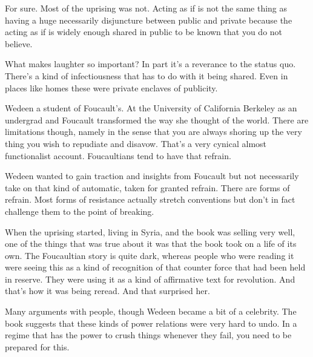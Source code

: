 \documentclass{article}
\begin{document}
\vspace{5mm}

For sure.  Most of the uprising was not.  Acting as if is not the same thing as having a huge necessarily disjuncture between public and private because the acting as if is widely enough shared in public to be known that you do not believe.  

\vspace{5mm}

What makes laughter so important?  In part it's a reverance to the status quo.  There's a kind of infectiousness that has to do with it being shared.  Even in places like homes these were private enclaves of publicity.  

\vspace{5mm}

Wedeen a student of Foucault's.  At the University of California Berkeley as an undergrad and Foucault transformed the way she thought of the world.  There are limitations though, namely in the sense that you are always shoring up the very thing you wish to repudiate and disavow.  That's a very cynical almost functionalist account.  Foucaultians tend to have that refrain.  

\vspace{5mm}

Wedeen wanted to gain traction and insights from Foucault but not necessarily take on that kind of automatic, taken for granted refrain.  There are forms of refrain.  Most forms of resistance actually stretch conventions but don't in fact challenge them to the point of breaking.  

\vspace{5mm}

When the uprising started, living in Syria, and the book was selling very well, one of the things that was true about it was that the book took on a life of its own.  The Foucaultian story is quite dark, whereas people who were reading it were seeing this as a kind of recognition of that counter force that had been held in reserve.  They were using it as a kind of affirmative text for revolution.  And that's how it was being reread.  And that surprised her.  

\vspace{5mm}

Many arguments with people, though Wedeen became a bit of a celebrity.  The book suggests that these kinds of power relations were very hard to undo.  In a regime that has the power to crush things whenever they fail, you need to be prepared for this.  
\end{document}
